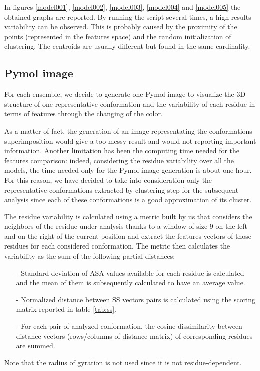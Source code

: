 In figures \ref{model001}, \ref{model002}, \ref{model003}, \ref{model004} and \ref{model005} the obtained graphs are reported. By running the script several times, a high results variability can be observed.
This is probably caused by the proximity of the points (represented in the features space) and the random initialization of clustering. The centroids are usually different but found in the same cardinality.



\subsection{Pymol image}
For each ensemble, we decide to generate one Pymol image to visualize the 3D structure of one representative conformation and the variability of each residue in terms of features through the changing of the color. 

As a matter of fact, the generation of an image representating the conformations superimposition would give a too messy result and would not reporting important information. 
Another limitation has been the computing time needed for the features comparison: indeed, considering the residue variability over all the models, the time needed only for the Pymol image generation is about one hour. For this reason, we have decided to take into consideration only the representative conformations extracted by clustering step for the subsequent analysis since each of these conformations is a good approximation of its cluster.

\medskip
The residue variability is calculated using a metric built by us that considers the neighbors of the residue under analysis thanks to a window of size 9 on the left and on the right of the current position and extract the features vectors of those residues for each considered conformation. 
The metric then calculates the variability as the sum of the following partial distances:
\begin{itemize}
\item[-] Standard deviation of ASA values available for each residue is calculated and the mean of them is subsequently calculated to have an average value.
\item[-] Normalized distance between SS vectors pairs is calculated using the scoring matrix reported in table \ref{tab:ss}.
\item[-] For each pair of analyzed conformation, the cosine dissimilarity between distance vectors (rows/columns of distance matrix) of corresponding residues are summed.
\end{itemize}
Note that the radius of gyration is not used since it is not residue-dependent.

